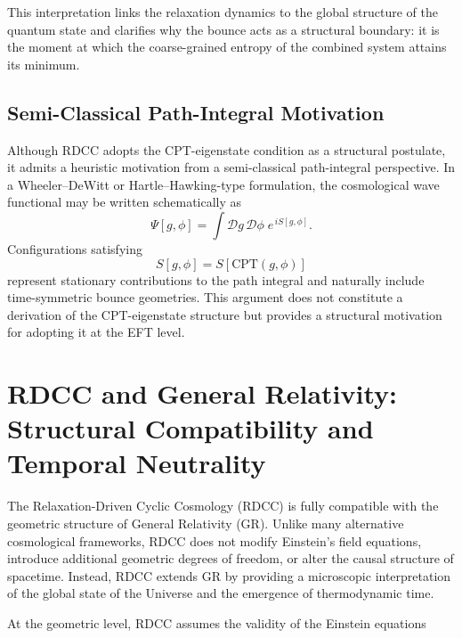 \documentclass[11pt,a4paper]{article}
\begin{document}
This interpretation links the relaxation dynamics to the global structure of the
quantum state and clarifies why the bounce acts as a structural boundary: it is
the moment at which the coarse-grained entropy of the combined system attains
its minimum.


\subsection{Semi-Classical Path-Integral Motivation}

Although RDCC adopts the CPT-eigenstate condition as a structural postulate, it
admits a heuristic motivation from a semi-classical path-integral perspective.
In a Wheeler–DeWitt or Hartle–Hawking-type formulation, the cosmological wave
functional may be written schematically as
\begin{equation}
    \Psi[g,\phi] = \int \mathcal{D}g\,\mathcal{D}\phi\;
    e^{\,i S[g,\phi]}.
\end{equation}
Configurations satisfying
\begin{equation}
    S[g,\phi] = S[\mathrm{CPT}(g,\phi)]
\end{equation}
represent stationary contributions to the path integral and naturally include
time-symmetric bounce geometries. This argument does not constitute a derivation
of the CPT-eigenstate structure but provides a structural motivation for adopting
it at the EFT level.


\section{RDCC and General Relativity: Structural Compatibility and Temporal Neutrality}

The Relaxation-Driven Cyclic Cosmology (RDCC) is fully compatible with the
geometric structure of General Relativity (GR). Unlike many alternative
cosmological frameworks, RDCC does not modify Einstein’s field equations,
introduce additional geometric degrees of freedom, or alter the causal
structure of spacetime. Instead, RDCC extends GR by providing a microscopic
interpretation of the global state of the Universe and the emergence of
thermodynamic time.

At the geometric level, RDCC assumes the validity of the Einstein equations
\end{document}
